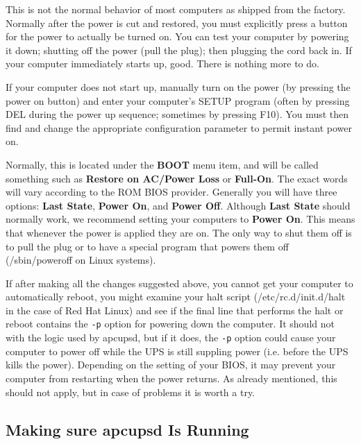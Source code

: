 This is not the normal behavior of most computers as shipped from the factory.
Normally after the power is cut and restored, you must explicitly press a
button for the power to actually be turned on. You can test your computer by
powering it down; shutting off the power (pull the plug); then plugging the
cord back in. If your computer immediately starts up, good. There is nothing
more to do.  

If your computer does not start up, manually turn on the power (by pressing
the power on button) and enter your computer's SETUP program (often by
pressing DEL during the power up sequence; sometimes by pressing F10). You
must then find and change the appropriate configuration parameter to permit
instant power on.  

Normally, this is located under the {\bf BOOT} menu item, and will be called
something such as {\bf Restore on AC/Power Loss} or {\bf Full-On}. The exact
words will vary according to the ROM BIOS provider. Generally you will have
three options: {\bf Last State}, {\bf Power On}, and {\bf Power Off}. Although
{\bf Last State} should normally work, we recommend setting your computers to
{\bf Power On}. This means that whenever the power is applied they are on. The
only way to shut them off is to pull the plug or to have a special program
that powers them off (/sbin/poweroff on Linux systems).  

If after making all the changes suggested above, you cannot get your computer
to automatically reboot, you might examine your halt script
(/etc/rc.d/init.d/halt in the case of Red Hat Linux) and see if the final line
that performs the halt or reboot contains the {\tt -p} option for powering
down the computer. It should not with the logic used by apcupsd, but if it
does, the {\tt -p} option could cause your computer to power off while the UPS
is still suppling power (i.e. before the UPS kills the power).  Depending on
the setting of your BIOS, it may prevent your computer from restarting when
the power returns. As already mentioned, this should not apply, but in case of
problems it is worth a try. 

\label{Making-sure-apcupsd-Is-Running}

\subsection*{Making sure apcupsd Is Running}

